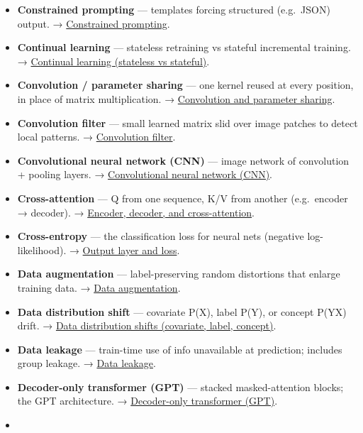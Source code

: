 \documentclass[
  10pt,
  letterpaper,
  onecolumn]{article}
\begin{document}
\begin{itemize}
{  likelihood}.
\item
  \textbf{Constrained prompting} --- templates forcing structured
  (e.g.~JSON) output. →
  \protect\hyperlink{constrained-prompting}{Constrained prompting}.
\item
  \textbf{Continual learning} --- stateless retraining vs stateful
  incremental training. →
  \protect\hyperlink{continual-learning-stateless-vs-stateful}{Continual
  learning (stateless vs stateful)}.
\item
  \textbf{Convolution / parameter sharing} --- one kernel reused at
  every position, in place of matrix multiplication. →
  \protect\hyperlink{convolution-and-parameter-sharing}{Convolution and
  parameter sharing}.
\item
  \textbf{Convolution filter} --- small learned matrix slid over image
  patches to detect local patterns. →
  \protect\hyperlink{convolution-filter}{Convolution filter}.
\item
  \textbf{Convolutional neural network (CNN)} --- image network of
  convolution + pooling layers. →
  \protect\hyperlink{convolutional-neural-network-cnn}{Convolutional
  neural network (CNN)}.
\item
  \textbf{Cross-attention} --- Q from one sequence, K/V from another
  (e.g.~encoder → decoder). →
  \protect\hyperlink{encoder-decoder-and-cross-attention}{Encoder,
  decoder, and cross-attention}.
\item
  \textbf{Cross-entropy} --- the classification loss for neural nets
  (negative log-likelihood). →
  \protect\hyperlink{output-layer-and-loss}{Output layer and loss}.
\item
  \textbf{Data augmentation} --- label-preserving random distortions
  that enlarge training data. →
  \protect\hyperlink{data-augmentation}{Data augmentation}.
\item
  \textbf{Data distribution shift} --- covariate P(X), label P(Y), or
  concept P(Y\textbar X) drift. →
  \protect\hyperlink{data-distribution-shifts-covariate-label-concept}{Data
  distribution shifts (covariate, label, concept)}.
\item
  \textbf{Data leakage} --- train-time use of info unavailable at
  prediction; includes group leakage. →
  \protect\hyperlink{data-leakage}{Data leakage}.
\item
  \textbf{Decoder-only transformer (GPT)} --- stacked masked-attention
  blocks; the GPT architecture. →
  \protect\hyperlink{decoder-only-transformer-gpt}{Decoder-only
  transformer (GPT)}.
\item

\end{itemize}
\end{document}
